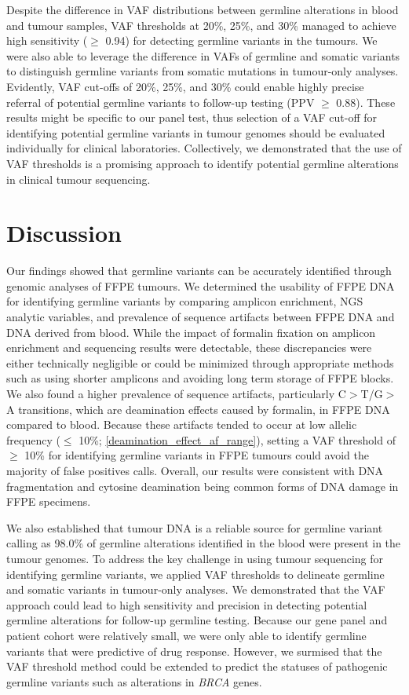 \documentclass{bmcart}
\begin{document}
Despite the difference in VAF distributions between germline alterations in blood and tumour samples, VAF thresholds at 20\%, 25\%, and 30\% managed to achieve high sensitivity ($\geq$ 0.94) for detecting germline variants in the tumours. We were also able to leverage the difference in VAFs of germline and somatic variants to distinguish germline variants from somatic mutations in tumour-only analyses. Evidently, VAF cut-offs of 20\%, 25\%, and 30\% could enable highly precise referral of potential germline variants to follow-up testing (PPV $\geq$ 0.88). These results might be specific to our panel test, thus selection of a VAF cut-off for identifying potential germline variants in tumour genomes should be evaluated individually for clinical laboratories. Collectively, we demonstrated that the use of VAF thresholds is a promising approach to identify potential germline alterations in clinical tumour sequencing.

\section*{Discussion}

Our findings showed that germline variants can be accurately identified through genomic analyses of FFPE tumours. We determined the usability of FFPE DNA for identifying germline variants by comparing amplicon enrichment, NGS analytic variables, and prevalence of sequence artifacts between FFPE DNA and DNA derived from blood. While the impact of formalin fixation on amplicon enrichment and sequencing results were detectable, these discrepancies were either technically negligible or could be minimized through appropriate methods such as using shorter amplicons and avoiding long term storage of FFPE blocks. We also found a higher prevalence of sequence artifacts, particularly C$>$T/G$>$A transitions, which are deamination effects caused by formalin, in FFPE DNA compared to blood. Because these artifacts tended to occur at low allelic frequency ($\leq$ 10\%; \autoref{deamination_effect_af_range}), setting a VAF threshold of $\geq$ 10\% for identifying germline variants in FFPE tumours could avoid the majority of false positives calls. Overall, our results were consistent with DNA fragmentation and cytosine deamination being common forms of DNA damage in FFPE specimens.

We also established that tumour DNA is a reliable source for germline variant calling as 98.0\% of germline alterations identified in the blood were present in the tumour genomes. To address the key challenge in using tumour sequencing for identifying germline variants, we applied VAF thresholds to delineate germline and somatic variants in tumour-only analyses. We demonstrated that the VAF approach could lead to high sensitivity and precision in detecting potential germline alterations for follow-up germline testing. Because our gene panel and patient cohort were relatively small, we were only able to identify germline variants that were predictive of drug response. However, we surmised that the VAF threshold method could be extended to predict the statuses of pathogenic germline variants such as alterations in \textit{BRCA} genes.
\end{document}
